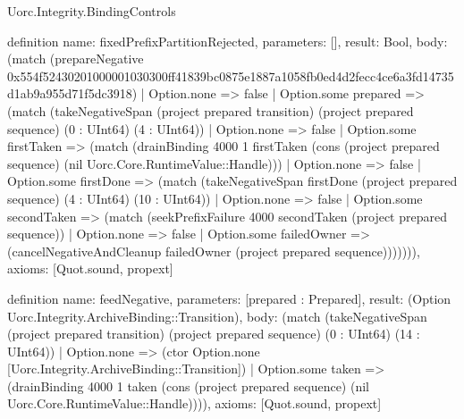 \begin{lexlean}{Uorc.Integrity.BindingControls}
\begin{semanticmodule}
definition{
  name: fixedPrefixPartitionRejected,
  parameters: [],
  result: Bool,
  body: (match (prepareNegative 0x554f52430201000001030300ff41839bc0875e1887a1058fb0ed4d2fecc4ce6a3fd14735d1ab9a955d71f5dc3918)
    | Option.none => false
    | Option.some prepared => (match (takeNegativeSpan (project prepared transition) (project prepared sequence) (0 : UInt64) (4 : UInt64))
      | Option.none => false
      | Option.some firstTaken => (match (drainBinding 4000 1 firstTaken (cons (project prepared sequence) (nil Uorc.Core.RuntimeValue::Handle)))
        | Option.none => false
        | Option.some firstDone => (match (takeNegativeSpan firstDone (project prepared sequence) (4 : UInt64) (10 : UInt64))
          | Option.none => false
          | Option.some secondTaken => (match (seekPrefixFailure 4000 secondTaken (project prepared sequence))
            | Option.none => false
            | Option.some failedOwner => (cancelNegativeAndCleanup failedOwner (project prepared sequence))))))),
  axioms: [Quot.sound, propext]
}

definition{
  name: feedNegative,
  parameters: [prepared : Prepared],
  result: (Option Uorc.Integrity.ArchiveBinding::Transition),
  body: (match (takeNegativeSpan (project prepared transition) (project prepared sequence) (0 : UInt64) (14 : UInt64))
    | Option.none => (ctor Option.none [Uorc.Integrity.ArchiveBinding::Transition])
    | Option.some taken => (drainBinding 4000 1 taken (cons (project prepared sequence) (nil Uorc.Core.RuntimeValue::Handle)))),
  axioms: [Quot.sound, propext]
}


\end{semanticmodule}
\end{lexlean}
